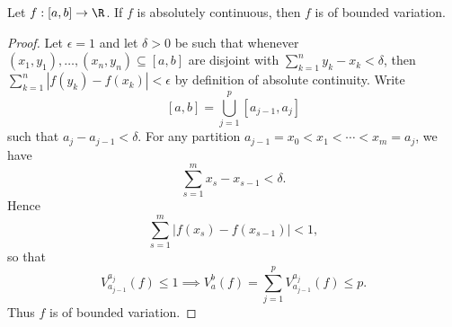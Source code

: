 \documentclass[pmath451]{subfiles}
\begin{document}
    \begin{prop}{}
        Let $f:\left[ a,b \right]\to\R$. If $f$ is absolutely continuous, then $f$ is of bounded variation.
    \end{prop}

    \begin{proof}
        Let $\epsilon=1$ and let $\delta>0$ be such that whenever $\left( x_1,y_1 \right),\ldots,\left( x_n,y_n \right)\subseteq\left[ a,b \right]$ are disjoint with $\sum^{n}_{k=1}y_k-x_k<\delta$, then $\sum^{n}_{k=1} \left| f\left( y_k \right)-f\left( x_k \right) \right|<\epsilon$ by definition of absolute continuity. Write
        \begin{equation*}
            \left[ a,b \right] = \bigcup^{p}_{j=1} \left[ a_{j-1},a_j \right]
        \end{equation*}
        such that $a_j-a_{j-1}<\delta$. For any partition $a_{j-1} = x_0 < x_1 < \cdots < x_m = a_j$, we have
        \begin{equation*}
            \sum^{m}_{s=1} x_s - x_{s-1} < \delta.
        \end{equation*}
        Hence
        \begin{equation*}
            \sum^{m}_{s=1} \left| f\left( x_s \right)-f\left( x_{s-1} \right) \right| < 1,
        \end{equation*}
        so that
        \begin{equation*}
            V^{a_j}_{a_{j-1}} \left( f \right) \leq 1 \implies V^b_a \left( f \right) = \sum^{p}_{j=1} V^{a_j}_{a_{j-1}}\left( f \right) \leq p.
        \end{equation*}
        Thus $f$ is of bounded variation.
    \end{proof}
    
\end{document}
